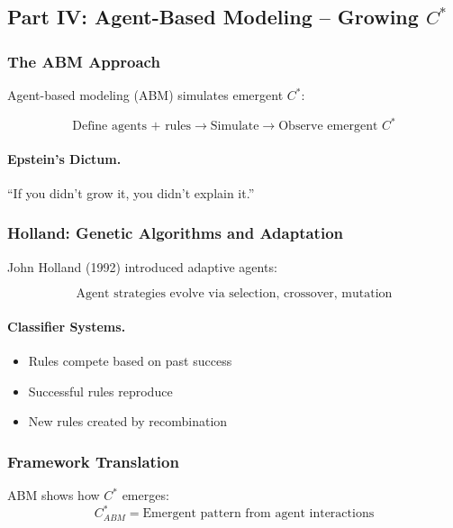 \subsection{Part IV: Agent-Based Modeling – Growing $C^*$}

\subsubsection{The ABM Approach}

Agent-based modeling (ABM) simulates emergent $C^*$:

\begin{equation}
\boxed{
\text{Define agents + rules} \to \text{Simulate} \to \text{Observe emergent } C^*
}
\label{eq:abm}
\end{equation}

\paragraph{Epstein's Dictum.}
``If you didn't grow it, you didn't explain it.''

\subsubsection{Holland: Genetic Algorithms and Adaptation}

John Holland (1992) introduced adaptive agents:

\begin{equation}
\text{Agent strategies evolve via selection, crossover, mutation}
\end{equation}

\paragraph{Classifier Systems.}
\begin{itemize}
    \item Rules compete based on past success
    \item Successful rules reproduce
    \item New rules created by recombination
\end{itemize}

\subsubsection{Framework Translation}

ABM shows how $C^*$ emerges:
\begin{equation}
C^*_{ABM} = \text{Emergent pattern from agent interactions}
\end{equation}

